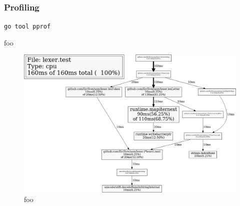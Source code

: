 
\subsubsection{Profiling}
\label{sec:ver_profiling}



\texttt{go tool pprof}

foo

\begin{figure}[htbp]
	\begin{center}
		\includegraphics[width=\textwidth]{inc/8_ver/lexer_pprof.png}
		\caption{foo}
	\end{center}
\end{figure}
